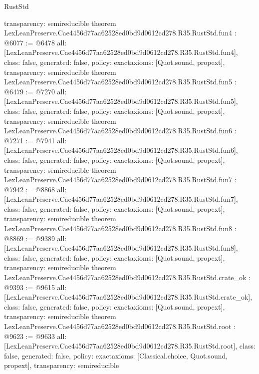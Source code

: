 \begin{lexlean}{RustStd}
\begin{coremodule}
{  transparency: semireducible
}
theorem LexLeanPreserve.Cae4456d77aa62528ed0bd9d0612cd278.R35.RustStd.fun4 : @6077 := @6478 {
  all: [LexLeanPreserve.Cae4456d77aa62528ed0bd9d0612cd278.R35.RustStd.fun4],
  class: false,
  generated: false,
  policy: exact{axioms: [Quot.sound, propext]},
  transparency: semireducible
}
theorem LexLeanPreserve.Cae4456d77aa62528ed0bd9d0612cd278.R35.RustStd.fun5 : @6479 := @7270 {
  all: [LexLeanPreserve.Cae4456d77aa62528ed0bd9d0612cd278.R35.RustStd.fun5],
  class: false,
  generated: false,
  policy: exact{axioms: [Quot.sound, propext]},
  transparency: semireducible
}
theorem LexLeanPreserve.Cae4456d77aa62528ed0bd9d0612cd278.R35.RustStd.fun6 : @7271 := @7941 {
  all: [LexLeanPreserve.Cae4456d77aa62528ed0bd9d0612cd278.R35.RustStd.fun6],
  class: false,
  generated: false,
  policy: exact{axioms: [Quot.sound, propext]},
  transparency: semireducible
}
theorem LexLeanPreserve.Cae4456d77aa62528ed0bd9d0612cd278.R35.RustStd.fun7 : @7942 := @8868 {
  all: [LexLeanPreserve.Cae4456d77aa62528ed0bd9d0612cd278.R35.RustStd.fun7],
  class: false,
  generated: false,
  policy: exact{axioms: [Quot.sound, propext]},
  transparency: semireducible
}
theorem LexLeanPreserve.Cae4456d77aa62528ed0bd9d0612cd278.R35.RustStd.fun8 : @8869 := @9389 {
  all: [LexLeanPreserve.Cae4456d77aa62528ed0bd9d0612cd278.R35.RustStd.fun8],
  class: false,
  generated: false,
  policy: exact{axioms: [Quot.sound, propext]},
  transparency: semireducible
}
theorem LexLeanPreserve.Cae4456d77aa62528ed0bd9d0612cd278.R35.RustStd.crate_ok : @9393 := @9615 {
  all: [LexLeanPreserve.Cae4456d77aa62528ed0bd9d0612cd278.R35.RustStd.crate_ok],
  class: false,
  generated: false,
  policy: exact{axioms: [Quot.sound, propext]},
  transparency: semireducible
}
theorem LexLeanPreserve.Cae4456d77aa62528ed0bd9d0612cd278.R35.RustStd.root : @9623 := @9633 {
  all: [LexLeanPreserve.Cae4456d77aa62528ed0bd9d0612cd278.R35.RustStd.root],
  class: false,
  generated: false,
  policy: exact{axioms: [Classical.choice, Quot.sound, propext]},
  transparency: semireducible
}


\end{coremodule}
\end{lexlean}
